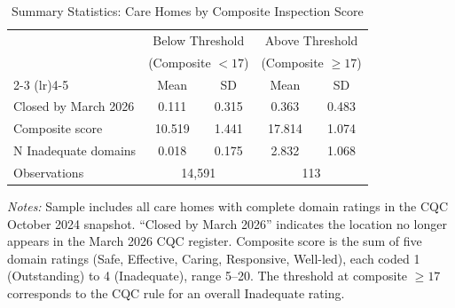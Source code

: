 \begin{table}[t]
\centering
\begin{threeparttable}
\caption{Summary Statistics: Care Homes by Composite Inspection Score}
\label{tab:summary}
\begin{tabular}{lcccc}
\toprule
 & \multicolumn{2}{c}{Below Threshold} & \multicolumn{2}{c}{Above Threshold} \\
 & \multicolumn{2}{c}{(Composite $< 17$)} & \multicolumn{2}{c}{(Composite $\geq 17$)} \\
\cmidrule(lr){2-3} \cmidrule(lr){4-5}
 & Mean & SD & Mean & SD \\
\midrule
Closed by March 2026 & 0.111 & 0.315 & 0.363 & 0.483 \\
Composite score & 10.519 & 1.441 & 17.814 & 1.074 \\
N Inadequate domains & 0.018 & 0.175 & 2.832 & 1.068 \\
\midrule
Observations & \multicolumn{2}{c}{14,591} & \multicolumn{2}{c}{113} \\
\bottomrule
\end{tabular}
\begin{tablenotes}[flushleft]
\small
\item \textit{Notes:} Sample includes all care homes with complete domain ratings in the CQC October 2024 snapshot. ``Closed by March 2026'' indicates the location no longer appears in the March 2026 CQC register. Composite score is the sum of five domain ratings (Safe, Effective, Caring, Responsive, Well-led), each coded 1 (Outstanding) to 4 (Inadequate), range 5--20. The threshold at composite $\geq 17$ corresponds to the CQC rule for an overall Inadequate rating.
\end{tablenotes}
\end{threeparttable}
\end{table}
